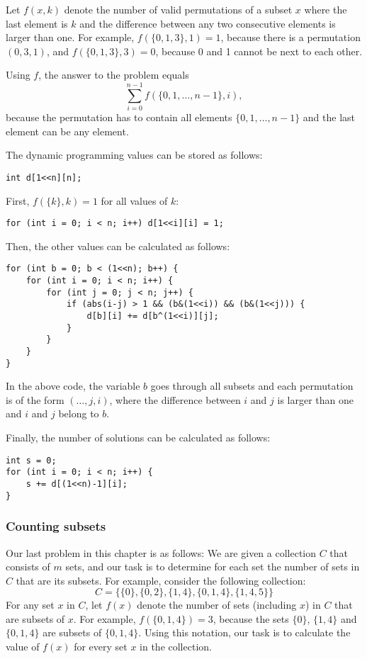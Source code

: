 Let $f(x,k)$ denote the number of valid permutations
of a subset $x$ where the last element is $k$ and
the difference between any two consecutive
elements is larger than one.
For example, $f(\{0,1,3\},1)=1$,
because there is a permutation $(0,3,1)$,
and $f(\{0,1,3\},3)=0$, because 0 and 1
cannot be next to each other.

Using $f$, the answer to the problem equals
\[ \sum_{i=0}^{n-1} f(\{0,1,\ldots,n-1\},i), \]
because the permutation has to contain all
elements $\{0,1,\ldots,n-1\}$ and the last
element can be any element.

The dynamic programming values can be stored as follows:
\begin{lstlisting}
int d[1<<n][n];
\end{lstlisting}

First, $f(\{k\},k)=1$ for all values of $k$:
\begin{lstlisting}
for (int i = 0; i < n; i++) d[1<<i][i] = 1;
\end{lstlisting}

Then, the other values can be calculated
as follows:
\begin{lstlisting}
for (int b = 0; b < (1<<n); b++) {
    for (int i = 0; i < n; i++) {
        for (int j = 0; j < n; j++) {
            if (abs(i-j) > 1 && (b&(1<<i)) && (b&(1<<j))) {
                d[b][i] += d[b^(1<<i)][j];
            }
        }
    }
}
\end{lstlisting}

In the above code,
the variable $b$ goes through all subsets and each
permutation is of the form $(\ldots,j,i)$,
where the difference between $i$ and $j$ is
larger than one and $i$ and $j$ belong to $b$.

Finally, the number of solutions can be
calculated as follows:

\begin{lstlisting}
int s = 0;
for (int i = 0; i < n; i++) {
    s += d[(1<<n)-1][i];
}
\end{lstlisting}

\subsubsection{Counting subsets}

Our last problem in this chapter is as follows:
We are given a collection $C$ that consists of $m$ sets,
and our task is to determine for each set
the number of sets in $C$ that are its subsets.
For example, consider the following collection:
\[C = \{\{0\}, \{0,2\}, \{1,4\}, \{0,1,4\}, \{1,4,5\}\}\]
For any set $x$ in $C$,
let $f(x)$ denote the number of sets (including $x$) in $C$
that are subsets of $x$.
For example, $f(\{0,1,4\})=3$, because the
sets $\{0\}$, $\{1,4\}$ and $\{0,1,4\}$ are
subsets of $\{0,1,4\}$.
Using this notation, our task is to calculate the value of $f(x)$
for every set $x$ in the collection.

